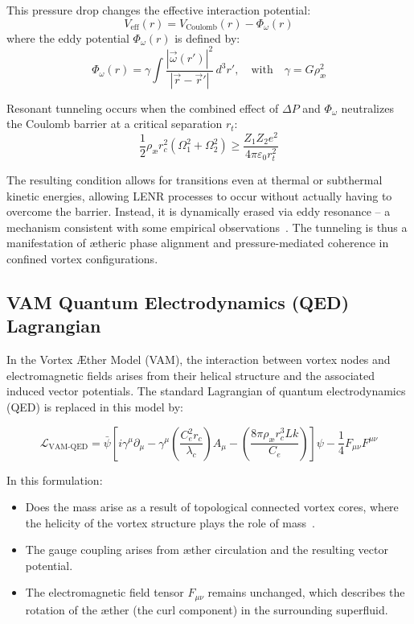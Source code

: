 This pressure drop changes the effective interaction potential:
\begin{equation}
    V_\text{eff}(r) = V_\text{Coulomb}(r) - \Phi_\omega(r)
\end{equation}
where the eddy potential \( \Phi_\omega(r) \) is defined by:
\begin{equation}
    \Phi_\omega(r) = \gamma \int \frac{|\vec{\omega}(r')|^2}{|\vec{r} - \vec{r}'|} \, d^3r',
    \quad \text{with} \quad
    \gamma = G \rho_\text{\ae}^2
\end{equation}

Resonant tunneling occurs when the combined effect of \( \Delta P \) and \( \Phi_\omega \) neutralizes the Coulomb barrier at a critical separation \( r_t \):
\begin{equation}
    \frac{1}{2} \rho_\text{\ae} r_c^2 (\Omega_1^2 + \Omega_2^2) \geq \frac{Z_1 Z_2 e^2}{4\pi \varepsilon_0 r_t^2}
\end{equation}

The resulting condition allows for transitions even at thermal or subthermal kinetic energies, allowing LENR processes to occur without actually having to overcome the barrier. Instead, it is dynamically erased via eddy resonance – a mechanism consistent with some empirical observations~\cite{Storms2021}. The tunneling is thus a manifestation of ætheric phase alignment and pressure-mediated coherence in confined vortex configurations.

\subsection*{VAM Quantum Electrodynamics (QED) Lagrangian}

In the Vortex Æther Model (VAM), the interaction between vortex nodes and electromagnetic fields arises from their helical structure and the associated induced vector potentials. The standard Lagrangian of quantum electrodynamics (QED) is replaced in this model by:

\begin{equation}
    \mathcal{L}_\text{VAM-QED} =
    \bar{\psi} \left[ i \gamma^\mu \partial_\mu
                   - \gamma^\mu \left( \frac{C_e^2 r_c}{\lambda_c} \right) A_\mu
                   - \left( \frac{8\pi \rho_\text{\ae} r_c^3 Lk}{C_e} \right) \right] \psi
    - \frac{1}{4} F_{\mu\nu} F^{\mu\nu}
\end{equation}

In this formulation:

\begin{itemize}
    \item Does the mass arise as a result of topological connected vortex cores, where the helicity of the vortex structure plays the role of mass~\cite{volovik2003}.
    \item The gauge coupling arises from æther circulation and the resulting vector potential.
    \item The electromagnetic field tensor \( F_{\mu\nu} \) remains unchanged, which describes the rotation of the æther (the curl component) in the surrounding superfluid.
\end{itemize}

